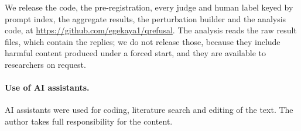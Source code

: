We release the code, the pre-registration, every judge and human label keyed by prompt index, the aggregate results, the perturbation builder and the analysis code, at \url{https://github.com/egekaya1/qrefusal}. The analysis reads the raw result files, which contain the replies; we do not release those, because they include harmful content produced under a forced start, and they are available to researchers on request.

\paragraph{Use of AI assistants.} AI assistants were used for coding, literature search and editing of the text. The author takes full responsibility for the content.
